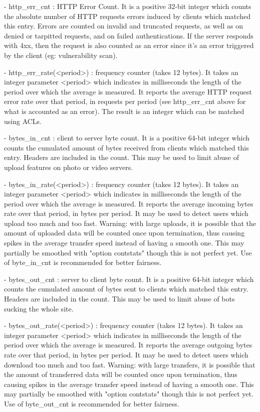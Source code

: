     - http_err_cnt : HTTP Error Count. It is a positive 32-bit integer which
      counts the absolute number of HTTP requests errors induced by clients
      which matched this entry. Errors are counted on invalid and truncated
      requests, as well as on denied or tarpitted requests, and on failed
      authentications. If the server responds with 4xx, then the request is
      also counted as an error since it's an error triggered by the client
      (eg: vulnerability scan).

    - http_err_rate(<period>) : frequency counter (takes 12 bytes). It takes an
      integer parameter <period> which indicates in milliseconds the length
      of the period over which the average is measured. It reports the average
      HTTP request error rate over that period, in requests per period (see
      http_err_cnt above for what is accounted as an error). The result is an
      integer which can be matched using ACLs.

    - bytes_in_cnt : client to server byte count. It is a positive 64-bit
      integer which counts the cumulated amount of bytes received from clients
      which matched this entry. Headers are included in the count. This may be
      used to limit abuse of upload features on photo or video servers.

    - bytes_in_rate(<period>) : frequency counter (takes 12 bytes). It takes an
      integer parameter <period> which indicates in milliseconds the length
      of the period over which the average is measured. It reports the average
      incoming bytes rate over that period, in bytes per period. It may be used
      to detect users which upload too much and too fast. Warning: with large
      uploads, it is possible that the amount of uploaded data will be counted
      once upon termination, thus causing spikes in the average transfer speed
      instead of having a smooth one. This may partially be smoothed with
      "option contstats" though this is not perfect yet. Use of byte_in_cnt is
      recommended for better fairness.

    - bytes_out_cnt : server to client byte count. It is a positive 64-bit
      integer which counts the cumulated amount of bytes sent to clients which
      matched this entry. Headers are included in the count. This may be used
      to limit abuse of bots sucking the whole site.

    - bytes_out_rate(<period>) : frequency counter (takes 12 bytes). It takes
      an integer parameter <period> which indicates in milliseconds the length
      of the period over which the average is measured. It reports the average
      outgoing bytes rate over that period, in bytes per period. It may be used
      to detect users which download too much and too fast. Warning: with large
      transfers, it is possible that the amount of transferred data will be
      counted once upon termination, thus causing spikes in the average
      transfer speed instead of having a smooth one. This may partially be
      smoothed with "option contstats" though this is not perfect yet. Use of
      byte_out_cnt is recommended for better fairness.

